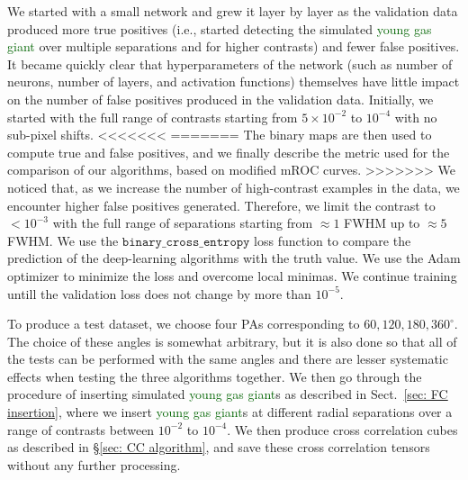 \documentclass{aa}
\newcommand{\newchange}[1]{\textcolor{darkgreen}{#1}}
\begin{document}
{{{We started with a small network and grew it layer by layer as the validation data produced more true positives (i.e., started detecting the simulated \newchange{young gas giant} over multiple separations and for higher contrasts) and fewer false positives.
It became quickly clear that hyperparameters of the network (such as number of neurons, number of layers, and activation functions) themselves have little impact on the number of false positives produced in the validation data.
Initially, we started with the full range of contrasts starting from $5\times10^{-2}$ to $10^{-4}$ with no sub-pixel shifts.
<<<<<<<
=======
The binary maps are then used to compute true and false positives, and we finally describe the metric used for the comparison of our algorithms, based on modified mROC curves.
>>>>>>>
We noticed that, as we increase the number of high-contrast examples in the data, we encounter higher false positives generated. Therefore, we limit the contrast to $<10^{-3}$ with the full range of separations starting from $\approx 1$ FWHM up to $\approx 5$ FWHM.
We use the $\texttt{binary\_cross\_entropy}$ loss function \citep{1993Li} to compare the prediction of the deep-learning algorithms with the truth value.
We use the Adam optimizer \citep{2014Adam} to minimize the loss and overcome local minimas.
We continue training untill the validation loss does not change by more than $10^{-5}$.

To produce a test dataset, we choose four PAs corresponding to $60,120,180,360^{\circ}$.
The choice of these angles is somewhat arbitrary, but it is also done so that all of the tests can be performed with the same angles and there are lesser systematic effects when testing the three algorithms together.
We then go through the procedure of inserting simulated \newchange{young gas giant}s as described in Sect.~\ref{sec: FC insertion}, where we insert \newchange{young gas giant}s at different radial separations over a range of contrasts between $10^{-2}$ to $10^{-4}$. We then produce cross correlation cubes as described in \S\ref{sec: CC algorithm}, and save these cross correlation tensors without any further processing.


}}}
\end{document}
